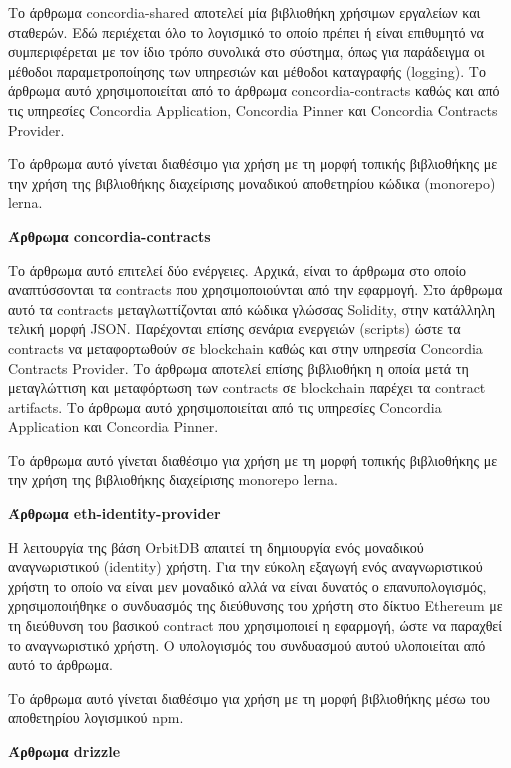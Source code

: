 Το άρθρωμα concordia-shared αποτελεί μία βιβλιοθήκη χρήσιμων εργαλείων και σταθερών. Εδώ περιέχεται όλο το λογισμικό το οποίο πρέπει ή είναι επιθυμητό να συμπεριφέρεται με τον ίδιο τρόπο συνολικά στο σύστημα, όπως για παράδειγμα οι μέθοδοι παραμετροποίησης των υπηρεσιών και μέθοδοι καταγραφής (logging). Το άρθρωμα αυτό χρησιμοποιείται από το άρθρωμα concordia-contracts καθώς και από τις υπηρεσίες Concordia Application, Concordia Pinner και Concordia Contracts Provider.

Το άρθρωμα αυτό γίνεται διαθέσιμο για χρήση με τη μορφή τοπικής βιβλιοθήκης με την χρήση της βιβλιοθήκης διαχείρισης μοναδικού αποθετηρίου κώδικα (monorepo) lerna.

\vspace{0.5cm}
\textbf{Άρθρωμα concordia-contracts}

Το άρθρωμα αυτό επιτελεί δύο ενέργειες. Αρχικά, είναι το άρθρωμα στο οποίο αναπτύσσονται τα contracts που χρησιμοποιούνται από την εφαρμογή. Στο άρθρωμα αυτό τα contracts μεταγλωττίζονται από κώδικα γλώσσας Solidity, στην κατάλληλη τελική μορφή JSON. Παρέχονται επίσης σενάρια ενεργειών (scripts) ώστε τα contracts να μεταφορτωθούν σε blockchain καθώς και στην υπηρεσία Concordia Contracts Provider. Το άρθρωμα αποτελεί επίσης βιβλιοθήκη η οποία μετά τη μεταγλώττιση και μεταφόρτωση των contracts σε blockchain παρέχει τα contract artifacts. Το άρθρωμα αυτό χρησιμοποιείται από τις υπηρεσίες Concordia Application και Concordia Pinner.

Το άρθρωμα αυτό γίνεται διαθέσιμο για χρήση με τη μορφή τοπικής βιβλιοθήκης με την χρήση της βιβλιοθήκης διαχείρισης monorepo lerna.

\vspace{0.5cm}
\textbf{Άρθρωμα eth-identity-provider}

Η λειτουργία της βάση OrbitDB απαιτεί τη δημιουργία ενός μοναδικού αναγνωριστικού (identity) χρήστη. Για την εύκολη εξαγωγή ενός αναγνωριστικού χρήστη το οποίο να είναι μεν μοναδικό αλλά να είναι δυνατός ο επανυπολογισμός, χρησιμοποιήθηκε ο συνδυασμός της διεύθυνσης του χρήστη στο δίκτυο Ethereum με τη διεύθυνση του βασικού contract που χρησιμοποιεί η εφαρμογή, ώστε να παραχθεί το αναγνωριστικό χρήστη. Ο υπολογισμός του συνδυασμού αυτού υλοποιείται από αυτό το άρθρωμα.

Το άρθρωμα αυτό γίνεται διαθέσιμο για χρήση με τη μορφή βιβλιοθήκης μέσω του αποθετηρίου λογισμικού npm.

\vspace{0.5cm}
\textbf{Άρθρωμα drizzle}

